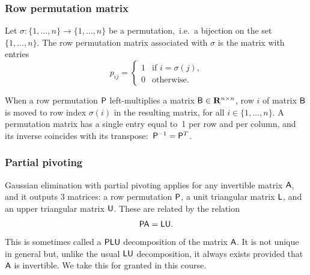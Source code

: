 \subsubsection*{Row permutation matrix}%
\begin{definition}
    \label{definition:row_permutation_matrix}%
    Let $\sigma : \{1, \dotsc, n\} \to \{1, \dotsc, n\}$ be a permutation,\
    i.e.\ a bijection on the set~$\{1, \dotsc, n\}$.
    The row permutation matrix associated with $\sigma$ is the matrix with entries
    \[
        p_{ij} =
        \begin{cases}
            1 & \text{if $i = \sigma(j)$,} \\
            0 & \text{otherwise.}
        \end{cases}
    \]
\end{definition}
When a row permutation $\mathsf P$ left-multiplies a matrix $\mathsf B \in \mathbf R^{n \times n}$,
row $i$ of matrix $\mathsf B$ is moved to row index $\sigma(i)$ in the resulting matrix,
for all $i \in \{1, \dots, n\}$.
A permutation matrix has a single entry equal to~1 per row and per column,
and its inverse coincides with its transpose:~$\mathsf P^{-1} = \mathsf P^T$.

\subsubsection*{Partial pivoting}%
Gaussian elimination with partial pivoting applies for any invertible matrix $\mathsf A$,
and it outputs 3 matrices: a row permutation $\mathsf P$, a unit triangular matrix $\mathsf L$,
and an upper triangular matrix $\mathsf U$.
These are related by the relation
\[
    \mathsf P \mathsf A = \mathsf L \mathsf U.
\]
This is sometimes called a $\mathsf P \mathsf L \mathsf U$ decomposition of the matrix $\mathsf A$.
It is not unique in general but, unlike the usual $\mathsf L \mathsf U$ decomposition,
it always exists provided that $\mathsf A$ is invertible.
We take this for granted in this course.

